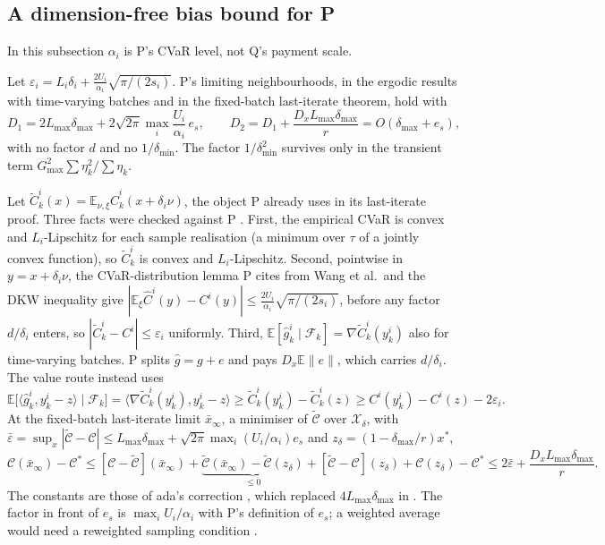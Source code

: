 \documentclass{article}
\begin{document}
\subsection{A dimension-free bias bound for P}

In this subsection \(\alpha_i\) is P's CVaR level, not Q's payment scale.

\begin{claim}
Let \(\varepsilon_i=L_i\delta_i+\tfrac{2U_i}{\alpha_i}\sqrt{\pi/(2s_i)}\). P's limiting neighbourhoods, in the ergodic results with time-varying batches and in the fixed-batch last-iterate theorem, hold with
\[
D_1=2L_{\max}\delta_{\max}+2\sqrt{2\pi}\max_i\frac{U_i}{\alpha_i}\,e_s,\qquad D_2=D_1+\frac{D_xL_{\max}\delta_{\max}}{r}=O(\delta_{\max}+e_s),
\]
with no factor \(d\) and no \(1/\delta_{\min}\). The factor \(1/\delta_{\min}^2\) survives only in the transient term \(G_{\max}^2\sum\eta_k^2/\sum\eta_k\). 
\end{claim}

Let \(\widetilde C^i_k(x)=\mathbb E_{\nu,\xi}\widehat C^i_k(x+\delta_i\nu)\), the object P already uses in its last-iterate proof. Three facts were checked against P . First, the empirical CVaR is convex and \(L_i\)-Lipschitz for each sample realisation (a minimum over \(\tau\) of a jointly convex function), so \(\widetilde C^i_k\) is convex and \(L_i\)-Lipschitz. Second, pointwise in \(y=x+\delta_i\nu\), the CVaR-distribution lemma P cites from Wang et al.\ and the DKW inequality give \(|\mathbb E_\xi\widehat C^i(y)-C^i(y)|\le\tfrac{2U_i}{\alpha_i}\sqrt{\pi/(2s_i)}\), before any factor \(d/\delta_i\) enters, so \(|\widetilde C^i_k-C^i|\le\varepsilon_i\) uniformly. Third, \(\mathbb E[\hat g^i_k\mid\mathcal F_k]=\nabla\widetilde C^i_k(y^i_k)\) also for time-varying batches. P splits \(\hat g=g+e\) and pays \(D_x\mathbb E\|e\|\), which carries \(d/\delta_i\). The value route instead uses 
\[
\mathbb E\big[\langle\hat g^i_k,y^i_k-z\rangle\mid\mathcal F_k\big]=\langle\nabla\widetilde C^i_k(y^i_k),y^i_k-z\rangle\ge\widetilde C^i_k(y^i_k)-\widetilde C^i_k(z)\ge C^i(y^i_k)-C^i(z)-2\varepsilon_i .
\]
At the fixed-batch last-iterate limit \(\bar x_\infty\), a minimiser of \(\widetilde{\mathcal C}\) over \(\mathcal X_\delta\), with \(\bar\varepsilon=\sup_x|\widetilde{\mathcal C}-\mathcal C|\le L_{\max}\delta_{\max}+\sqrt{2\pi}\max_i(U_i/\alpha_i)e_s\) and \(z_\delta=(1-\delta_{\max}/r)x^\ast\),
\[
\mathcal C(\bar x_\infty)-\mathcal C^\ast\le[\mathcal C-\widetilde{\mathcal C}](\bar x_\infty)+\underbrace{\widetilde{\mathcal C}(\bar x_\infty)-\widetilde{\mathcal C}(z_\delta)}_{\le0}+[\widetilde{\mathcal C}-\mathcal C](z_\delta)+\mathcal C(z_\delta)-\mathcal C^\ast\le2\bar\varepsilon+\frac{D_xL_{\max}\delta_{\max}}{r}.
\]
The constants are those of ada's correction , which replaced \(4L_{\max}\delta_{\max}\) in . The factor in front of \(e_s\) is \(\max_iU_i/\alpha_i\) with P's definition of \(e_s\); a weighted average would need a reweighted sampling condition .
\end{document}
